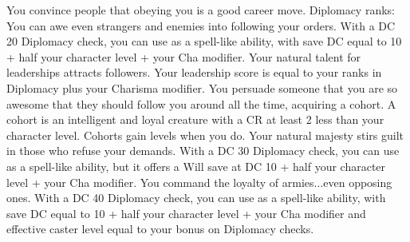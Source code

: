 \skillfeat
{You convince people that obeying you is a good career move.}
{Diplomacy ranks:}
{You can awe even strangers and enemies into following your orders. With a DC 20 Diplomacy check, you can use  as a spell-like ability, with save DC equal to 10 + half your character level + your Cha modifier.}
{Your natural talent for leaderships attracts followers. Your leadership score is equal to your ranks in Diplomacy plus your Charisma modifier.}
{You persuade someone that you are so awesome that they should follow you around all the time, acquiring a cohort. A cohort is an intelligent and loyal creature with a CR at least 2 less than your character level. Cohorts gain levels when you do.}
{Your natural majesty stirs guilt in those who refuse your demands. With a DC 30 Diplomacy check, you can use  as a spell-like ability, but it offers a Will save at DC 10 + half your character level + your Cha modifier.}
{You command the loyalty of armies...even opposing ones. With a DC 40 Diplomacy check, you can use  as a spell-like ability, with save DC equal to 10 + half your character level + your Cha modifier and effective caster level equal to your bonus on Diplomacy checks.}